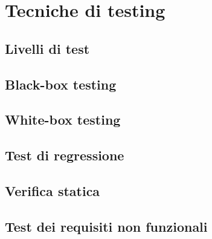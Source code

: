 \section{Tecniche di testing}

\subsection{Livelli di test}

\subsection{Black-box testing}

\subsection{White-box testing}

\subsection{Test di regressione}

\subsection{Verifica statica}

\subsection{Test dei requisiti non funzionali}

